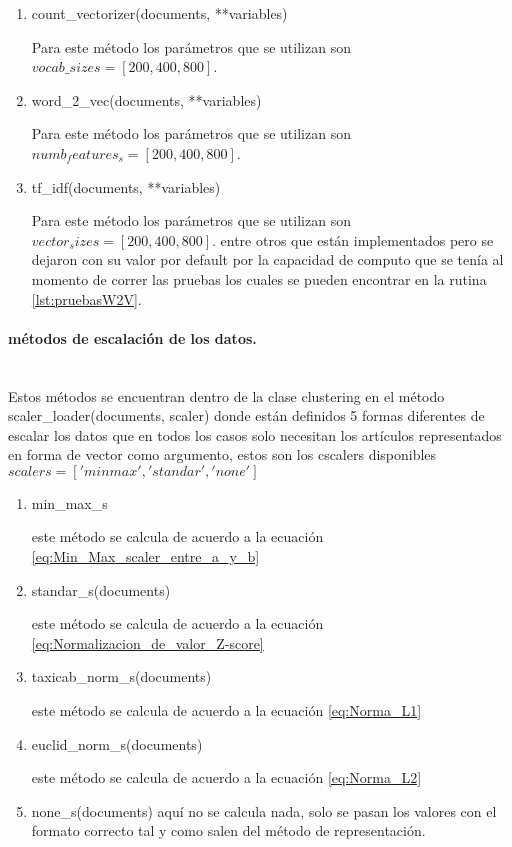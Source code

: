 \documentclass[12pt]{article}
\newcommand{\subsubsubsection}[1]{\paragraph{#1}\mbox{}\\}
\begin{document}
				\begin{enumerate}
					\item count\_vectorizer(documents, **variables)
					
					Para este método los parámetros que se utilizan son $vocab\_sizes = [200,400,800]$.
					
					\item word\_2\_vec(documents, **variables)
					
					Para este método los parámetros que se utilizan son $numb_features_s  = [200,400,800]$.
					
					\item tf\_idf(documents, **variables)
					
					Para este método los parámetros que se utilizan son $vector_sizes = [200,400,800]$.
					entre otros que están implementados pero se dejaron con su valor por default por la capacidad de computo que se tenía al momento de correr las pruebas los cuales se pueden encontrar en la rutina \ref{lst:pruebasW2V}.
					
				\end{enumerate}			
				
				\subsubsubsection{métodos de escalación de los datos.}
				Estos métodos se encuentran dentro de la clase clustering en el método scaler\_loader(documents, scaler) donde están definidos 5 formas diferentes de escalar los datos que en todos los casos solo necesitan los artículos representados en forma de vector como argumento, estos son los cscalers disponibles $scalers =  ['minmax', 'standar', 'none']$
			
				\begin{enumerate}
					\item min\_max\_s
					
					este método se calcula de acuerdo a la ecuación \ref{eq:Min_Max_scaler_entre_a_y_b}
					
					\item standar\_s(documents)
					
					este método se calcula de acuerdo a la ecuación \ref{eq:Normalizacion_de_valor_Z-score}
					
					\item taxicab\_norm\_s(documents)
					
					este método se calcula de acuerdo a la ecuación \ref{eq:Norma_L1}
								
					\item euclid\_norm\_s(documents)
					
					este método se calcula de acuerdo a la ecuación \ref{eq:Norma_L2}
								
					\item none\_s(documents)
					aquí no se calcula nada, solo se pasan los valores con el formato correcto tal y como salen del método de representación.
				
				\end{enumerate}			
					
\end{document}
